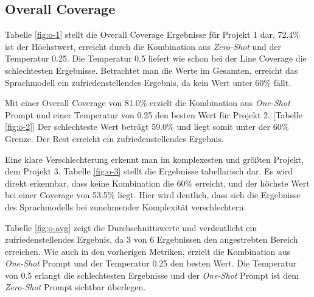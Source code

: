 \subsection{Overall Coverage}
Tabelle \ref{fig:o-1} stellt die Overall Coverage Ergebnisse für Projekt 1 dar. 72.4\% ist der Höchstwert, erreicht durch die Kombination aus \textit{Zero-Shot} und der Temperatur 0.25. Die Temperatur 0.5 liefert wie schon bei der Line Coverage die schlechtesten Ergebnisse. Betrachtet man die Werte im Gesamten, erreicht das Sprachmodell ein zufriedenstellendes Ergebnis, da kein Wert unter 60\% fällt.

Mit einer Overall Coverage von 81.0\% erzielt die Kombination aus \textit{One-Shot} Prompt und einer Temperatur von 0.25 den besten Wert für Projekt 2. [Tabelle \ref{fig:o-2}] Der schlechteste Wert beträgt 59.0\% und liegt somit unter der 60\% Grenze. Der Rest erreicht ein zufriedenstellendes Ergebnis.

Eine klare Verschlechterung erkennt man im komplexesten und größten Projekt, dem Projekt 3. Tabelle \ref{fig:o-3} stellt die Ergebnisse tabellarisch dar. Es wird direkt erkennbar, dass keine Kombination die 60\% erreicht, und der höchste Wert bei einer Coverage von 53.5\% liegt. Hier wird deutlich, dass sich die Ergebnisse des Sprachmodells bei zunehmender Komplexität verschlechtern.

Tabelle \ref{fig:o-avg} zeigt die Durchschnittswerte und verdeutlicht ein zufriedenstellendes Ergebnis, da 3 von 6 Ergebnissen den angestrebten Bereich erreichen. Wie auch in den vorherigen Metriken, erzielt die Kombination aus \textit{One-Shot} Prompt und der Temperatur 0.25 den besten Wert. Die Temperatur von 0.5 erlangt die schlechtesten Ergebnisse und der \textit{One-Shot} Prompt ist dem \textit{Zero-Shot} Prompt sichtbar überlegen.



